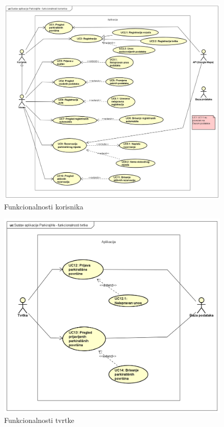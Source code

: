 					\begin{figure}[H]
						\includegraphics[scale=0.4]{dijagrami/funkcionalnosti_korisnika.png} %
						\centering
						\caption{Funkcionalnosti korisnika}
						\label{fig:promjene}
					\end{figure}
				
					\begin{figure}[H]
						\includegraphics[scale=0.55]{dijagrami/funkcionalnosti_tvrtke.png} %
						\centering
						\caption{Funkcionalnosti tvrtke}
						\label{fig:promjene}
					\end{figure}
				
